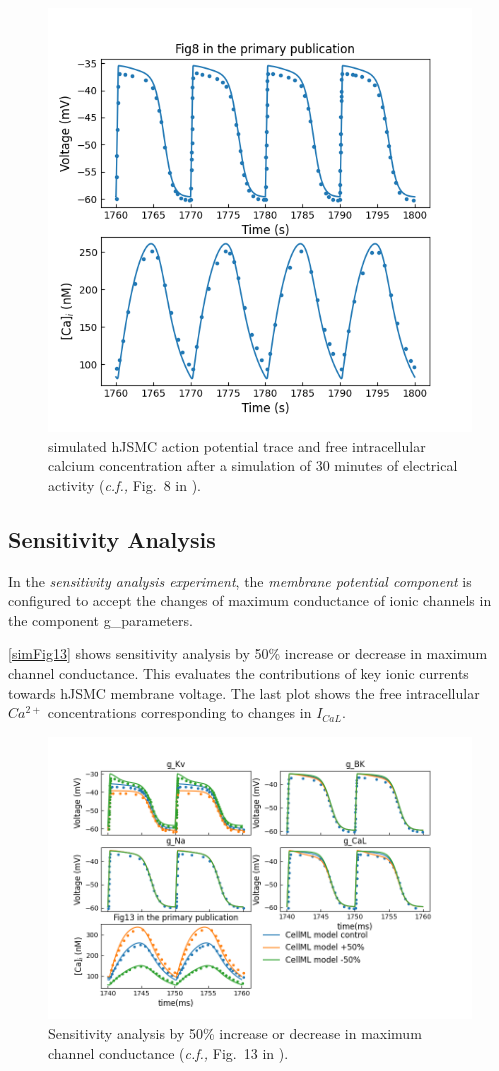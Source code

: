 \documentclass[fleqn,10pt]{physiome}
\begin{document}
\begin{figure}[ht]\centering
\includegraphics[width=0.7\linewidth]{./figs/simFig8.png}
\caption{simulated hJSMC action potential trace and free intracellular calcium concentration after a simulation of 30 minutes of electrical activity  (\emph{c.f.,} Fig.~8 in \citet{poh2012quantitative}).}
\label{simFig8}
\end{figure}


\subsection{Sensitivity Analysis}
In the \emph{sensitivity analysis experiment}, the \emph{membrane potential component} is configured to accept the changes of maximum conductance of ionic channels in the component g\_parameters.

\autoref{simFig13} shows sensitivity analysis by 50\% increase or decrease in maximum channel conductance. This evaluates the contributions of key ionic currents towards hJSMC membrane voltage. The last plot shows the free intracellular $Ca^{2+}$ concentrations corresponding to changes in $I_{CaL}$.

\begin{figure}[ht]\centering
\includegraphics[width=0.9\linewidth]{./figs/simFig13.png}
\caption{Sensitivity analysis by 50\% increase or decrease in maximum channel conductance  (\emph{c.f.,} Fig.~13 in \citet{poh2012quantitative}).}
\label{simFig13}
\end{figure}
\end{document}
